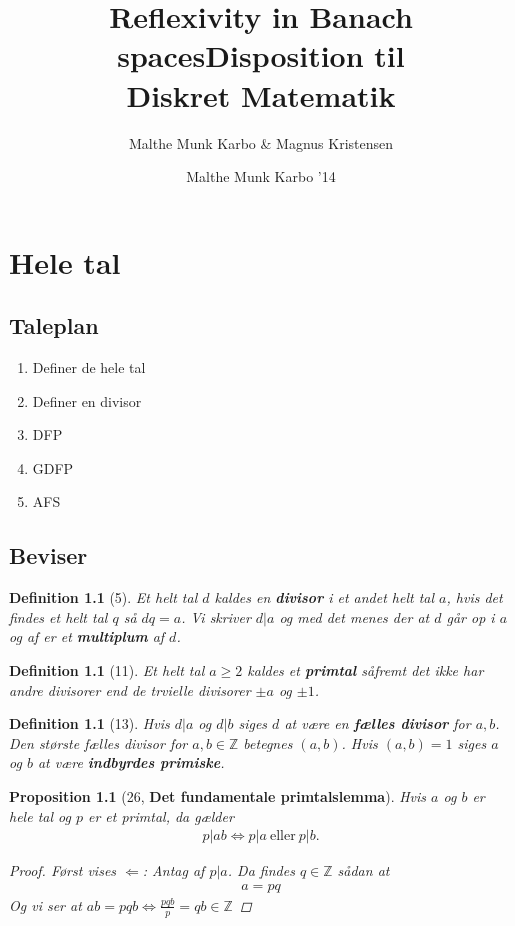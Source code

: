 \documentclass[10pt,twoside,openany,final]{memoir}
\title{Reflexivity in Banach spaces}
\author{Malthe Munk Karbo & Magnus Kristensen}
\title{Disposition til \\\textbf{Diskret Matematik}}
\author{Malthe Munk Karbo '14}
\theoremstyle{break}
\newtheorem{proposition}[section]{Proposition}
\newtheorem{definition}[section]{Definition}
\theoremstyle{Break}
\newcommand{\Z}{\mathbb{Z}}
\begin{document}
\maketitle
\newpage
\tableofcontents*
{}
\chapter{Hele tal}
\section*{Taleplan}
\begin{enumerate}
\item Definer de hele tal
\item Definer en divisor
\item DFP
\item GDFP
\item AFS
\end{enumerate}
\section*{Beviser}
\begin{definition}[5]
Et helt tal $d$ kaldes en \textbf{divisor} i et andet helt tal $a$, hvis det findes et helt tal $q$ så $dq=a$. Vi skriver $d|a$ og med det menes der at $d$ går op i $a$ og af er et \textbf{multiplum} af $d$.
\end{definition}
\begin{definition}[11]
Et helt tal $a\geq 2$ kaldes et \textbf{primtal} såfremt det ikke har andre divisorer end de trvielle divisorer $\pm a$ og $\pm 1$.
\end{definition}

\begin{definition}[13]
Hvis $d|a$ og $d|b$ siges $d$ at være en \textbf{fælles divisor} for $a,b$. Den største fælles divisor for $a,b \in \Z$ betegnes $(a,b)$. Hvis $(a,b)=1$ siges $a$ og $b$ at være \textbf{indbyrdes primiske}.
\end{definition}

\begin{proposition}[26, \textbf{Det fundamentale primtalslemma}]
Hvis $a$ og $b$ er hele tal og $p$ er et primtal, da gælder
\begin{align*}
p|ab \iff p|a \ \text{eller} \ p|b.
\end{align*}
\begin{proof}
Først vises $\Leftarrow$: Antag af $p|a$. Da findes $q \in \Z$ sådan at 
\begin{align*}
a=pq 
\end{align*}
Og vi ser at $ab=pqb \iff \frac{pqb}{p}=qb \in \Z$ 
\end{proof}
\end{proposition}
\end{document}
